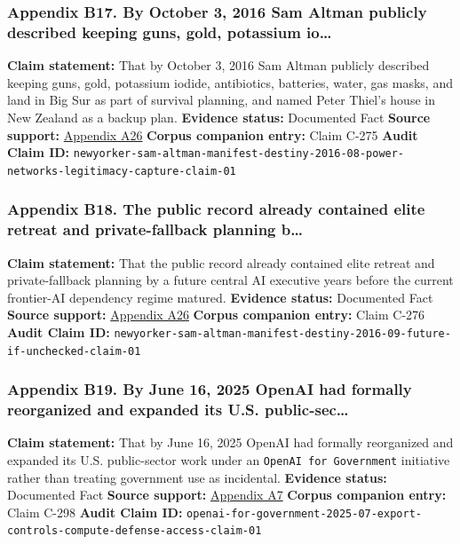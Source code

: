\documentclass[
  american,
  11pt,
  letterpaper,
]{article}
\begin{document}
\subsubsection{Appendix B17. By October 3, 2016 Sam Altman publicly
described keeping guns, gold, potassium
io\ldots{}}\label{appendix-b17-by-october-3-2016-sam-altman-publicly-described-keeping-guns-gold-potassium-io}

\textbf{Claim statement:} That by October 3, 2016 Sam Altman publicly
described keeping guns, gold, potassium iodide, antibiotics, batteries,
water, gas masks, and land in Big Sur as part of survival planning, and
named Peter Thiel's house in New Zealand as a backup plan.
\textbf{Evidence status:} Documented Fact \textbf{Source support:}
\hyperref[appendix-a26-sam-altman-s-manifest-destiny]{Appendix A26}
\textbf{Corpus companion entry:} Claim C-275 \textbf{Audit Claim ID:}
\texttt{newyorker-sam-altman-manifest-destiny-2016-08-power-networks-legitimacy-capture-claim-01}

\subsubsection{Appendix B18. The public record already contained elite
retreat and private-fallback planning
b\ldots{}}\label{appendix-b18-the-public-record-already-contained-elite-retreat-and-private-fallback-planning-b}

\textbf{Claim statement:} That the public record already contained elite
retreat and private-fallback planning by a future central AI executive
years before the current frontier-AI dependency regime matured.
\textbf{Evidence status:} Documented Fact \textbf{Source support:}
\hyperref[appendix-a26-sam-altman-s-manifest-destiny]{Appendix A26}
\textbf{Corpus companion entry:} Claim C-276 \textbf{Audit Claim ID:}
\texttt{newyorker-sam-altman-manifest-destiny-2016-09-future-if-unchecked-claim-01}

\subsubsection{Appendix B19. By June 16, 2025 OpenAI had formally
reorganized and expanded its U.S.
public-sec\ldots{}}\label{appendix-b19-by-june-16-2025-openai-had-formally-reorganized-and-expanded-its-u-s-public-sec}

\textbf{Claim statement:} That by June 16, 2025 OpenAI had formally
reorganized and expanded its U.S. public-sector work under an
\texttt{OpenAI\ for\ Government} initiative rather than treating
government use as incidental. \textbf{Evidence status:} Documented Fact
\textbf{Source support:}
\hyperref[appendix-a7-introducing-openai-for-government]{Appendix A7}
\textbf{Corpus companion entry:} Claim C-298 \textbf{Audit Claim ID:}
\texttt{openai-for-government-2025-07-export-controls-compute-defense-access-claim-01}
\end{document}
